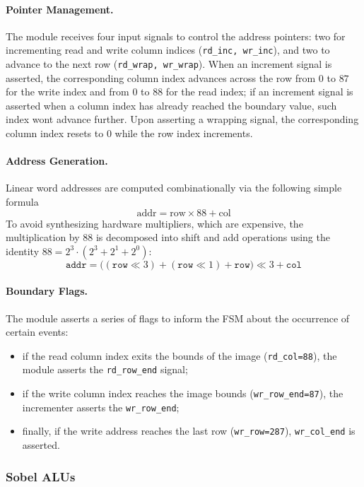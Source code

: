 \paragraph{Pointer Management.} The module receives four input signals to control the address pointers: two for incrementing read and write column indices (\texttt{rd\_inc, wr\_inc}), and two to advance to the next row (\texttt{rd\_wrap, wr\_wrap}). When an increment signal is asserted, the corresponding column index advances across the row from $0$ to $87$ for the write index and from $0$ to $88$ for the read index; if an increment signal is asserted when a column index has already reached the boundary value, such index wont advance further. Upon asserting a wrapping signal, the corresponding column index resets to $0$ while the row index increments.

\paragraph{Address Generation.} Linear word addresses are computed combinationally via the following simple formula
$$\text{addr} = \text{row} \times 88 + \text{col}$$ 
To avoid synthesizing hardware multipliers, which are expensive, the multiplication by $88$ is decomposed into shift and add operations using the identity $88 = 2^{3}\cdot(2^3+2^1+2^0)$:
$$\texttt{addr} = \bigl( (\texttt{row} \ll 3) + (\texttt{row} \ll 1) + \texttt{row} \bigr) \ll 3 + \texttt{col}$$
    
\paragraph{Boundary Flags.} The module asserts a series of flags to inform the FSM about the occurrence of certain events:
\begin{itemize}
    \item if the read column index exits the bounds of the image (\texttt{rd\_col=88}), the module asserts the \texttt{rd\_row\_end} signal;
    \item if the write column index reaches the image bounds (\texttt{wr\_row\_end=87}), the incrementer asserts the \texttt{wr\_row\_end};
    \item finally, if the write address reaches the last row (\texttt{wr\_row=287}), \texttt{wr\_col\_end} is asserted.
\end{itemize}

\subsubsection{Sobel ALUs}

